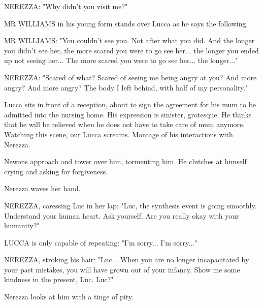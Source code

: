 \documentclass[11pt]{article}
\begin{document}
NEREZZA: "Why didn't you visit me?"

MR WILLIAMS in his young form stands over Lucca as he says the following.

MR WILLIAMS: "You couldn't see you. Not after what you did.
And the longer you didn't see her, the more scared you were to go see her...
the longer you ended up not seeing her...
The more scared you were to go see her...
the longer..."

NEREZZA: "Scared of what?
Scared of seeing me being angry at you?
And more angry?
And more angry?
The body I left behind, with half of my personality."

Lucca sits in front of a reception, about to sign the agreement for his mum to be admitted into the nursing home.
His expression is sinister, grotesque.
He thinks that he will be relieved when he does not have to take care of mum anymore.
Watching this scene, our Lucca screams. 
Montage of his interactions with Nerezza.

Newons approach and tower over him, tormenting him.
He clutches at himself crying and asking for forgiveness.

Nerezza waves her hand.

NEREZZA, caressing Luc in her lap: "Luc, the synthesis event is going smoothly.
Understand your human heart.
Ask yourself.
Are you really okay with your humanity?"

LUCCA is only capable of repeating: "I'm sorry... 
I'm sorry..."

NEREZZA, stroking his hair: "Luc... 
When you are no longer incapacitated by your past mistakes, you will have grown out of your infancy.
Show me some kindness in the present, Luc.
Luc?"

Nerezza looks at him with a tinge of pity.
\end{document}
